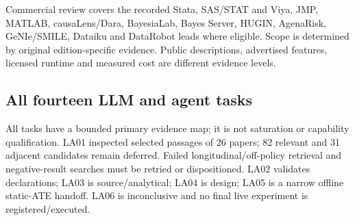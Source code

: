\documentclass[
  10pt,
]{article}
\begin{document}
Commercial review covers the recorded Stata, SAS/STAT and Viya, JMP,
MATLAB, causaLens/Dara, BayesiaLab, Bayes Server, HUGIN, AgenaRisk,
GeNIe/SMILE, Dataiku and DataRobot leads where eligible. Scope is
determined by original edition-specific evidence. Public descriptions,
advertised features, licensed runtime and measured cost are different
evidence levels.

\hypertarget{all-fourteen-llm-and-agent-tasks}{%
\subsection{All fourteen LLM and agent
tasks}\label{all-fourteen-llm-and-agent-tasks}}

All tasks have a bounded primary evidence map; it is not saturation or
capability qualification. LA01 inspected selected passages of 26 papers;
82 relevant and 31 adjacent candidates remain deferred. Failed
longitudinal/off-policy retrieval and negative-result searches must be
retried or dispositioned. LA02 validates declarations; LA03 is
source/analytical; LA04 is design; LA05 is a narrow offline static-ATE
handoff. LA06 is inconclusive and no final live experiment is
registered/executed.
\end{document}
